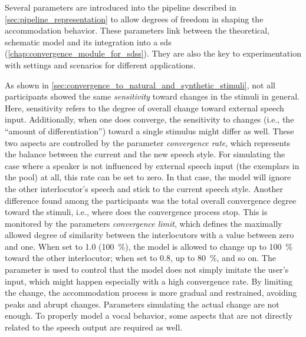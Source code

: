 Several parameters are introduced into the pipeline described in \cref{sec:pipeline_representation} to allow degrees of freedom in shaping the accommodation behavior.
These parameters link between the theoretical, schematic model and its integration into a \ac{sds} (\cref{chap:convergence_module_for_sdss}).
They are also the key to experimentation with settings and scenarios for different applications.

As shown in \cref{sec:convergence_to_natural_and_synthetic_stimuli}, not all participants showed the same \textit{sensitivity} toward changes in the stimuli in general.
Here, sensitivity refers to the degree of overall change toward external speech input.
Additionally, when one does converge, the sensitivity to changes (i.e., the \enquote{amount of differentiation}) toward a single stimulus might differ as well.
These two aspects are controlled by the parameter \textit{convergence rate}, which represents the balance between the current and the new speech style.
For simulating the case where a speaker is not influenced by external speech input (the exemplars in the pool) at all, this rate can be set to zero.
In that case, the model will ignore the other interlocutor's speech and stick to the current speech style.
Another difference found among the participants was the total overall convergence degree toward the stimuli, i.e., where does the convergence process stop.
This is monitored by the parameters \textit{convergence limit}, which defines the maximally allowed degree of similarity between the interlocutors with a value between zero and one.
When set to 1.0 (\SI{100}{\percent}), the model is allowed to change up to \SI{100}{\percent} toward the other interlocutor; when set to 0.8, up to \SI{80}{\percent}, and so on.
The parameter is used to control that the model does not simply imitate the user's input, which might happen especially with a high convergence rate.
By limiting the change, the accommodation process is more gradual and restrained, avoiding peaks and abrupt changes.
Parameters simulating the actual change are not enough.
To properly model a vocal behavior, some aspects that are not directly related to the speech output are required as well.

